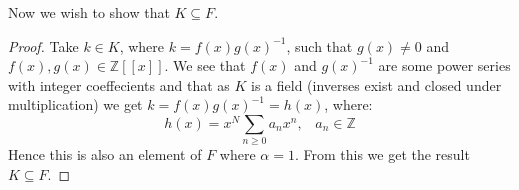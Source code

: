 \documentclass{article}
\theoremstyle{definition}
\begin{document}
\noindent Now we wish to show that $K\subseteq F$.
\begin{proof}
Take $k\in K$, where $k=f(x)g(x)^{-1}$, such that $g(x)\neq0$ and $f(x),g(x)\in\mathbb{Z}[[x]]$. We see that $f(x)$ and $g(x)^{-1}$ are some power series with integer coeffecients and that as $K$ is a field (inverses exist and closed under multiplication) we get $k=f(x)g(x)^{-1}=h(x)$, where:
$$h(x)=x^N\sum_{n\geq0}a_nx^n,\;\;\;a_n\in\mathbb{Z}$$
Hence this is also an element of $F$ where $\alpha=1$. From this we get the result $K\subseteq F$.
\end{proof}
\end{document}
